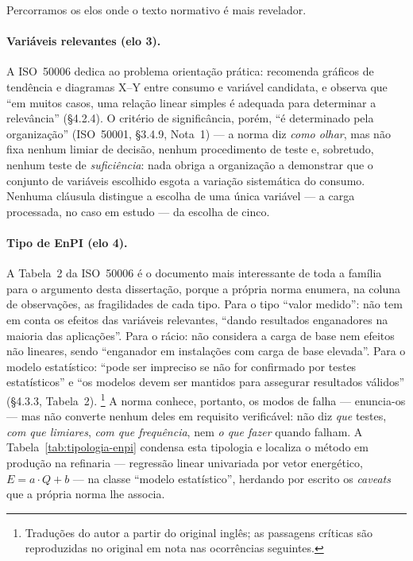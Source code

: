 Percorramos os elos onde o texto normativo é mais revelador.

\paragraph{Variáveis relevantes (elo 3).} A ISO~50006 dedica ao problema orientação prática: recomenda gráficos de tendência e diagramas X--Y entre consumo e variável candidata, e observa que \enquote{em muitos casos, uma relação linear simples é adequada para determinar a relevância} (\S4.2.4). O critério de significância, porém, \enquote{é determinado pela organização} (ISO~50001, \S3.4.9, Nota~1) --- a norma diz \emph{como olhar}, mas não fixa nenhum limiar de decisão, nenhum procedimento de teste e, sobretudo, nenhum teste de \emph{suficiência}: nada obriga a organização a demonstrar que o conjunto de variáveis escolhido esgota a variação sistemática do consumo. Nenhuma cláusula distingue a escolha de uma única variável --- a carga processada, no caso em estudo --- da escolha de cinco.

\paragraph{Tipo de EnPI (elo 4).} A Tabela~2 da ISO~50006 é o documento mais interessante de toda a família para o argumento desta dissertação, porque a própria norma enumera, na coluna de observações, as fragilidades de cada tipo. Para o tipo \enquote{valor medido}: não tem em conta os efeitos das variáveis relevantes, \enquote{dando resultados enganadores na maioria das aplicações}. Para o rácio: não considera a carga de base nem efeitos não lineares, sendo \enquote{enganador em instalações com carga de base elevada}. Para o modelo estatístico: \enquote{pode ser impreciso se não for confirmado por testes estatísticos} e \enquote{os modelos devem ser mantidos para assegurar resultados válidos} (\S4.3.3, Tabela~2). \footnote{Traduções do autor a partir do original inglês; as passagens críticas são reproduzidas no original em nota nas ocorrências seguintes.} A norma conhece, portanto, os modos de falha --- enuncia-os --- mas não converte nenhum deles em requisito verificável: não diz \emph{que} testes, \emph{com que limiares}, \emph{com que frequência}, nem \emph{o que fazer} quando falham. A Tabela~\ref{tab:tipologia-enpi} condensa esta tipologia e localiza o método em produção na refinaria --- regressão linear univariada por vetor energético, $E = a \cdot Q + b$ --- na classe \enquote{modelo estatístico}, herdando por escrito os \emph{caveats} que a própria norma lhe associa.

